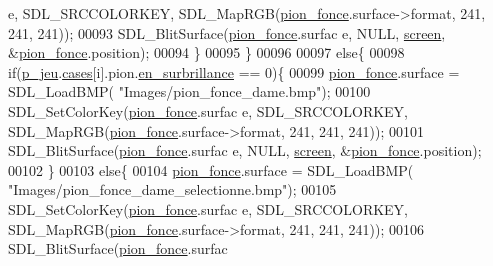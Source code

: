 \begin{DoxyCode}
      e, SDL\_SRCCOLORKEY, SDL\_MapRGB(\hyperlink{fonction_interface_8h_a91d0d5668d6c4d2c6cd5bbeab0f9ca15}{pion_fonce}.surface->format, 241, 241, 241));
00093                                                 SDL\_BlitSurface(\hyperlink{fonction_interface_8h_a91d0d5668d6c4d2c6cd5bbeab0f9ca15}{pion_fonce}.surfac
      e, NULL, \hyperlink{fonction_interface_8h_a78fa3957d73de49cb81d047857504218}{screen}, &\hyperlink{fonction_interface_8h_a91d0d5668d6c4d2c6cd5bbeab0f9ca15}{pion_fonce}.position);
00094                                         \}
00095                                 \}
00096 
00097                                 \textcolor{keywordflow}{else}\{
00098                                         \textcolor{keywordflow}{if}(\hyperlink{moteur_8h_a3efa8d0f7c65daedc584dc8db048e62c}{p_jeu}.\hyperlink{structplateau_a6afaa60f594542e0d742b0c6d3223392}{cases}[i].pion.\hyperlink{structpion_ae49bb71ca6836b02fd9efa3c1fa64405}{en_surbrillance} ==
       0)\{
00099                                                 \hyperlink{fonction_interface_8h_a91d0d5668d6c4d2c6cd5bbeab0f9ca15}{pion_fonce}.surface = SDL\_LoadBMP(
      \textcolor{stringliteral}{"Images/pion\_fonce\_dame.bmp"});
00100                                                 SDL\_SetColorKey(\hyperlink{fonction_interface_8h_a91d0d5668d6c4d2c6cd5bbeab0f9ca15}{pion_fonce}.surfac
      e, SDL\_SRCCOLORKEY, SDL\_MapRGB(\hyperlink{fonction_interface_8h_a91d0d5668d6c4d2c6cd5bbeab0f9ca15}{pion_fonce}.surface->format, 241, 241, 241));
00101                                                 SDL\_BlitSurface(\hyperlink{fonction_interface_8h_a91d0d5668d6c4d2c6cd5bbeab0f9ca15}{pion_fonce}.surfac
      e, NULL, \hyperlink{fonction_interface_8h_a78fa3957d73de49cb81d047857504218}{screen}, &\hyperlink{fonction_interface_8h_a91d0d5668d6c4d2c6cd5bbeab0f9ca15}{pion_fonce}.position);
00102                                         \}
00103                                         \textcolor{keywordflow}{else}\{
00104                                                 \hyperlink{fonction_interface_8h_a91d0d5668d6c4d2c6cd5bbeab0f9ca15}{pion_fonce}.surface = SDL\_LoadBMP(
      \textcolor{stringliteral}{"Images/pion\_fonce\_dame\_selectionne.bmp"});
00105                                                 SDL\_SetColorKey(\hyperlink{fonction_interface_8h_a91d0d5668d6c4d2c6cd5bbeab0f9ca15}{pion_fonce}.surfac
      e, SDL\_SRCCOLORKEY, SDL\_MapRGB(\hyperlink{fonction_interface_8h_a91d0d5668d6c4d2c6cd5bbeab0f9ca15}{pion_fonce}.surface->format, 241, 241, 241));
00106                                                 SDL\_BlitSurface(\hyperlink{fonction_interface_8h_a91d0d5668d6c4d2c6cd5bbeab0f9ca15}{pion_fonce}.surfac

\end{DoxyCode}
